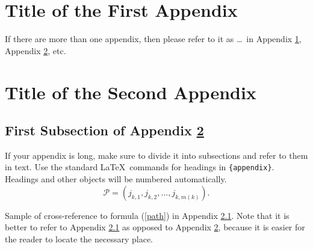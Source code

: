 \documentclass[ecta,nameyear,draft]{econsocart}
\theoremstyle{plain}
\theoremstyle{definition}
\begin{document}
\begin{appendix}
\section{Title of the First Appendix}\label{appA}
If there are more than one appendix, then please refer to it
as \ldots\ in Appendix \ref{appA}, Appendix \ref{appB}, etc.

\section{Title of the Second Appendix}\label{appB}
\subsection{First Subsection of Appendix \protect\ref{appB}}\label{appB1}

If your appendix is long, make sure to divide it into subsections and refer to them in text. Use the standard \LaTeX\ commands for headings in \verb|{appendix}|.
Headings and other objects will be numbered automatically.
\begin{equation}
\mathcal{P}=(j_{k,1},j_{k,2},\dots,j_{k,m(k)}). \label{path}
\end{equation}

Sample of cross-reference to formula (\ref{path}) in Appendix \ref{appB1}.
Note that it is better to refer to Appendix \ref{appB1} as opposed to Appendix \ref{appB}, because it is easier for the reader to locate the necessary place. \end{appendix}



\end{document}
